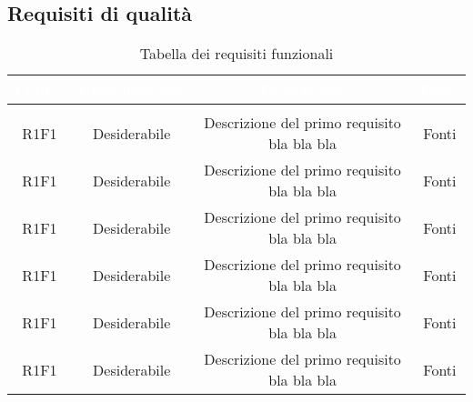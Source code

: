 \subsection{Requisiti di qualità}
\renewcommand{\arraystretch}{1.5}
\begin{center}
\begin{longtable}{C{\colA} C{\colB} C{\colC} C{\colA}}
		\textcolor{white}{\textbf{Codice}} & 
		\textcolor{white}{\textbf{Classificazione}} & 
		\textcolor{white}{\textbf{Descrizione}} & 
		\textcolor{white}{\textbf{Fonti}} \\
		\endfirsthead
	    \\
	    \endfoot
	    \caption{Tabella dei requisiti funzionali}
	    \endlastfoot

R1F1 & Desiderabile & Descrizione del primo requisito bla bla bla & Fonti \\
R1F1 & Desiderabile & Descrizione del primo requisito bla bla bla & Fonti \\
R1F1 & Desiderabile & Descrizione del primo requisito bla bla bla & Fonti \\
R1F1 & Desiderabile & Descrizione del primo requisito bla bla bla & Fonti \\
R1F1 & Desiderabile & Descrizione del primo requisito bla bla bla & Fonti \\
R1F1 & Desiderabile & Descrizione del primo requisito bla bla bla & Fonti \\
\end{longtable}
\end{center}